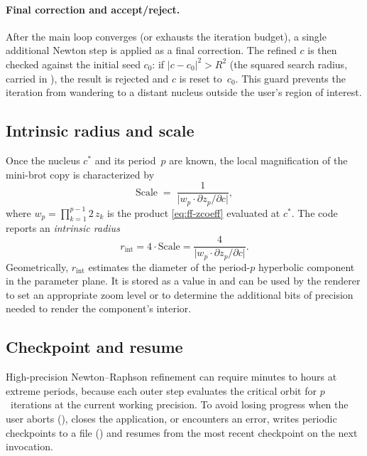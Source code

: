 \paragraph{Final correction and accept/reject.}
After the main loop converges (or exhausts the iteration budget), a single
additional Newton step is applied as a final correction.  The refined $c$ is
then checked against the initial seed $c_0$: if
$|c - c_0|^2 > R^2$ (the squared search radius, carried in ),
the result is rejected and $c$ is reset to~$c_0$.  This guard prevents the
iteration from wandering to a distant nucleus outside the user's region of
interest.

\subsection{Intrinsic radius and scale}
\label{subsec:ff-intrinsic-radius}

Once the nucleus $c^*$ and its period~$p$ are known, the local magnification
of the mini-brot copy is characterized by
\begin{equation}\label{eq:ff-scale}
\mathrm{Scale} \;=\;
  \frac{1}{\bigl|w_p \cdot \partial z_p/\partial c\bigr|},
\end{equation}
where $w_p = \prod_{k=1}^{p-1} 2\,z_k$ is the  product
\eqref{eq:ff-zcoeff} evaluated at $c^*$. The code reports an \emph{intrinsic radius}
\begin{equation}\label{eq:ff-intrinsic-radius}
r_{\mathrm{int}} = 4 \cdot \mathrm{Scale}
  = \frac{4}{\bigl|w_p \cdot \partial z_p/\partial c\bigr|}.
\end{equation}
Geometrically, $r_{\mathrm{int}}$ estimates the diameter of the
period-$p$ hyperbolic component in the parameter plane.  It is stored
as a  value in  and can be used by
the renderer to set an appropriate zoom level or to determine the additional
bits of precision needed to render the component's interior.

\subsection{Checkpoint and resume}
\label{subsec:ff-checkpoint}

High-precision Newton--Raphson refinement can require minutes to hours
at extreme periods, because each outer step evaluates the critical orbit
for $p$~iterations at the current working precision.  To avoid losing
progress when the user aborts (), closes the
application, or encounters an error, \FractalShark{} writes periodic
checkpoints to a file () and resumes from the
most recent checkpoint on the next invocation.

